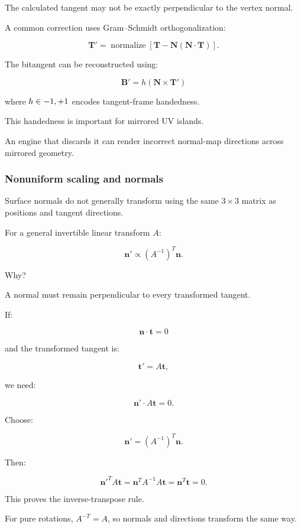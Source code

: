 The calculated tangent may not be exactly perpendicular to the vertex normal.

A common correction uses Gram--Schmidt orthogonalization:

\[
 \boxed{ \mathbf T'= \operatorname{normalize} \left[ \mathbf T-\mathbf N(\mathbf N\cdot\mathbf T) \right] }.
\]

The bitangent can be reconstructed using:

\[
 \boxed{ \mathbf B'=h(\mathbf N\times\mathbf T') }
\]

where \(h\in\\{-1,+1\\}\) encodes tangent-frame handedness.

This handedness is important for mirrored UV islands.

An engine that discards it can render incorrect normal-map directions across mirrored geometry.

\subsubsection{Nonuniform scaling and normals}\label{nonuniform-scaling-and-normals}

Surface normals do not generally transform using the same \(3\times3\) matrix as positions and tangent directions.

For a general invertible linear transform \(A\):

\[
 \boxed{ \mathbf n'\propto(A^{-1})^T\mathbf n }.
\]

Why?

A normal must remain perpendicular to every transformed tangent.

If:

\[
 \mathbf n\cdot\mathbf t=0
\]

and the transformed tangent is:

\[
 \mathbf t'=A\mathbf t,
\]

we need:

\[
 \mathbf n'\cdot A\mathbf t=0.
\]

Choose:

\[
 \mathbf n'=(A^{-1})^T\mathbf n.
\]

Then:

\[
 \mathbf n'^TA\mathbf t = \mathbf n^TA^{-1}A\mathbf t = \mathbf n^T\mathbf t=0.
\]

This proves the inverse-transpose rule.

For pure rotations, \(A^{-T}=A\), so normals and directions transform the same way.

